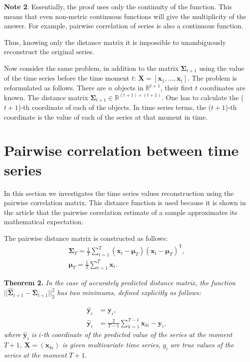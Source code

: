 \documentclass[12pt]{article}
\begin{document}
\textbf{Note 2}. Essentially, the proof uses only the continuity of the function. This means that even non-metric continuous functions will give the multiplicity of the answer. For example, pairwise correlation of series is also a continuous function.

Thus, knowing only the distance matrix it is impossible to unambiguously reconstruct the original series.

Now consider the same problem, in addition to the matrix $\mathbf{\Sigma}_{t+1}$ using the value of the time series before the time moment $t$: $\mathbf{X}=[\mathbf{x}_1, \ldots, \mathbf{x}_{t}]$. The problem is reformulated as follows. There are $n$ objects in $\mathbb{R}^{t+1}$, their first $t$ coordinates are known. The distance matrix $\mathbf{\Sigma}_{t+1} \in \mathbb{R}^{(t+1) \times (t+1)}$. One has to calculate the ($t+1$)-th coordinate of each of the objects. In time series terms, the ($t+1$)-th coordinate is the value of each of the series at that moment in time.

\section{Pairwise correlation between time series}

In this section we investigates the time series values reconstruction using the pairwise correlation matrix. This distance function is used because it is shown in the article \cite{puchkin2023sharper} that the pairwise correlation estimate of a sample approximates its mathematical expectation.

The pairwise distance matrix is constructed as follows:
\begin{gather*}
	{\mathbf{\Sigma}}_T = \frac{1}{T} \sum_{t=1}^{T} (\mathbf{x}_t - \boldsymbol{\mu}_T)(\mathbf{x}_t - \boldsymbol{\mu}_T)^\mathsf{T},\\
	\boldsymbol{\mu}_T = \frac{1}{T} \sum_{t=1}^{T} \mathbf{x}_t.
\end{gather*}

\textbf{Theorem 2.} \emph{In the case of accurately predicted distance matrix, the function} $||\hat{\mathbf{\Sigma}}_{t+1} - \bar{\mathbf{\Sigma}}_{t+1}||_2^2$ \emph{has two minimums, defined explicitly as follows:}

\begin{align*}
	\hat{\mathbf{y}}_i &= \mathbf{y}_i,\\
	\hat{\mathbf{y}}_i &= \frac{2}{T-1} \sum_{k=1}^{T-1} \mathbf{x}_{ki} - \mathbf{y}_i,
\end{align*}
\emph{where} $\hat{\mathbf{y}}_i$ \emph{is} $i$\emph{-th coordinate of the predicted value of the series at the moment $T+1$, $\mathbf{X}=(\mathbf{x}_{ki})$ is given multivariate time series,} $y_i$ \emph{are true values of the series at the moment} $T+1$.
\end{document}

